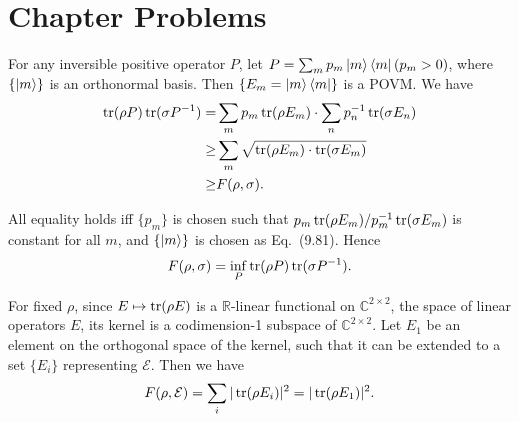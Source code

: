 \section*{Chapter Problems}

\prob For any inversible positive operator $P$, let $P=\sum_m p_m\left|m\right\rangle\left\langle m\right|(p_m>0)$, where $\{\left|m\right\rangle\}$ is an orthonormal basis.
Then $\{E_m=\left|m\right\rangle\left\langle m\right|\}$ is a POVM.
We have
$$\begin{aligned}
    \operatorname{tr}(\rho P)\operatorname{tr}(\sigma P^{-1})
    = & \sum_mp_m\operatorname{tr}(\rho E_m) \cdot \sum_np_n^{-1}\operatorname{tr}(\sigma E_n)
    \\ \ge & \sum_m \sqrt{\operatorname{tr}(\rho E_m)\cdot\operatorname{tr}(\sigma E_m)}
    \\ \ge & F(\rho, \sigma).
\end{aligned}$$

All equality holds iff $\{p_m\}$ is chosen such that $p_m\operatorname{tr}(\rho E_m)/p_m^{-1}\operatorname{tr}(\sigma E_m)$ is constant for all $m$, and $\{\left|m\right\rangle\}$ is chosen as Eq.~(9.81).
Hence
$$F(\rho, \sigma)=\inf_P\operatorname{tr}(\rho P)\operatorname{tr}(\sigma P^{-1}).$$

\prob For fixed $\rho$, since $E\mapsto\operatorname{tr}(\rho E)$ is a $\mathbb{R}$-linear functional on $\mathbb{C}^{2\times 2}$, the space of linear operators $E$, its kernel is a codimension-1 subspace of $\mathbb{C}^{2\times 2}$.
Let $E_1$ be an element on the orthogonal space of the kernel, such that it can be extended to a set $\{E_i\}$ representing $\mathcal{E}$.
Then we have
$$F(\rho,\mathcal{E}) = \sum_i|\operatorname{tr}(\rho E_i)|^2 = |\operatorname{tr}(\rho E_1)|^2.$$

\prob \todo